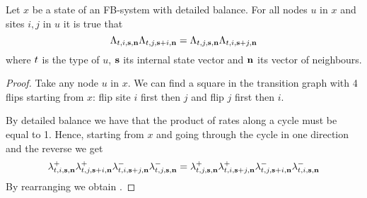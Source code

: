\begin{lemma}
  \label{lemma:flipflip}
  Let $x$ be a state of an FB-system with detailed balance.
  For all nodes $u$ in $x$ and sites $i,j$ in $u$ it is true that
  \begin{equation}
    \label{eq:flipflip}
    \Lambda_{t,i,\boldsymbol{\mathbf{s}},\boldsymbol{\mathbf{n}}}
    \Lambda_{t,j,\boldsymbol{\mathbf{s}}+i,\boldsymbol{\mathbf{n}}} =
    \Lambda_{t,j,\boldsymbol{\mathbf{s}},\boldsymbol{\mathbf{n}}}
    \Lambda_{t,i,\boldsymbol{\mathbf{s}}+j,\boldsymbol{\mathbf{n}}}
  \end{equation}
  where $t$ is the type of $u$,
  $\boldsymbol{\mathbf{s}}$ its internal state vector
  and $\boldsymbol{\mathbf{n}}$ its vector of neighbours.
\end{lemma}
\begin{proof}
  Take any node $u$ in $x$.
  We can find a square in the transition graph
  with 4 flips starting from $x$:
  flip site $i$ first then $j$ and flip $j$ first then $i$.
  \begin{center}
  \end{center}
  By detailed balance we have that
  the product of rates along a cycle must be equal to 1.
  Hence, starting from $x$ and going through the cycle
  in one direction and the reverse we get
  \begin{equation*}
    \lambda^+_{t,i,\boldsymbol{\mathbf{s}},\boldsymbol{\mathbf{n}}}
    \lambda^+_{t,j,\boldsymbol{\mathbf{s}}+i,\boldsymbol{\mathbf{n}}}
    \lambda^-_{t,i,\boldsymbol{\mathbf{s}}+j,\boldsymbol{\mathbf{n}}}
    \lambda^-_{t,j,\boldsymbol{\mathbf{s}},\boldsymbol{\mathbf{n}}} =
    \lambda^+_{t,j,\boldsymbol{\mathbf{s}},\boldsymbol{\mathbf{n}}}
    \lambda^+_{t,i,\boldsymbol{\mathbf{s}}+j,\boldsymbol{\mathbf{n}}}
    \lambda^-_{t,j,\boldsymbol{\mathbf{s}}+i,\boldsymbol{\mathbf{n}}}
    \lambda^-_{t,i,\boldsymbol{\mathbf{s}},\boldsymbol{\mathbf{n}}}
  \end{equation*}
  By rearranging we obtain .
\end{proof}

